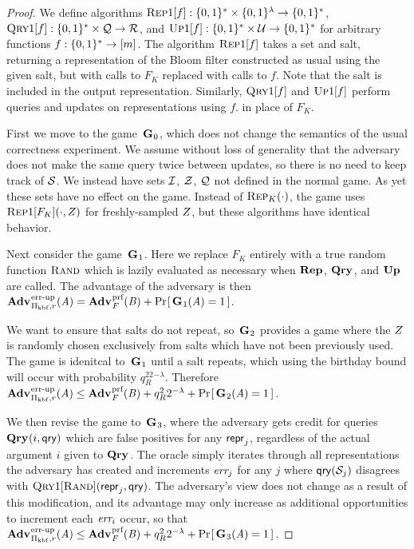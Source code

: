\begin{proof}We define algorithms $\textsc{Rep}1[f]: \{0,1\}^* \times \{0,1\}^\lambda \to \{0,1\}^*$, $\textsc{Qry}1[f]: \{0,1\}^* \times \mathcal{Q} \to \mathcal{R}$, and $\textsc{Up}1[f]: \{0,1\}^* \times \mathcal{U} \to \{0,1\}^*$ for arbitrary functions $f: \{0,1\}^* \to [m]$. The algorithm $\textsc{Rep}1[f]$ takes a set and salt, returning a representation of the Bloom filter constructed as usual using the given salt, but with calls to $F_K$ replaced with calls to $f$. Note that the salt is included in the output representation. Similarly, $\textsc{Qry}1[f]$ and $\textsc{Up}1[f]$ perform queries and updates on representations using $f$. in place of $F_K$.

First we move to the game~$\mathbf{G}\hspace{0.5pt}_0$, which does not change the semantics of the usual correctness experiment. We assume without loss of generality that the adversary does not make the same query twice between updates, so there is no need to keep track of $\mathcal{S}$. We instead have sets $\mathcal{I}$, $\mathcal{Z}$, $\mathcal{Q}$ not defined in the normal game. As yet these sets have no effect on the game. Instead of $\textsc{Rep}_K(\cdot)$, the game uses $\textsc{Rep}1[F_K](\cdot,Z)$ for freshly-sampled $Z$, but these algorithms have identical behavior.

Next consider the game~$\mathbf{G}\hspace{0.5pt}_1$. Here we replace $F_K$ entirely with a true random function $\textsc{Rand}$ which is lazily evaluated as necessary when $\mathbf{Rep}\hspace{0.5pt}$, $\mathbf{Qry}\hspace{0.5pt}$, and $\mathbf{Up}\hspace{0.5pt}$ are called. The advantage of the adversary is then $\Adv{\errep}_{\struct_\prfbloom,r}(\advA) = \Adv{\prf}_F(\advB) + \Prob{\G_1(\advA)=1}$.

We want to ensure that salts do not repeat, so~$\mathbf{G}\hspace{0.5pt}_2$ provides a game where the $Z$ is randomly chosen exclusively from salts which have not been previously used. The game is idenitcal to~$\mathbf{G}\hspace{0.5pt}_1$ until a salt repeats, which using the birthday bound will occur with probability $q_R^22^{-\lambda}$. Therefore $\Adv{\errep}_{\struct_\prfbloom,r}(\advA) \le \Adv{\prf}_F(\advB) + q_R^22^{-\lambda} + \Prob{\G_2(\advA)=1}$.

We then revise the game to~$\mathbf{G}\hspace{0.5pt}_3$, where the adversary gets credit for queries $\mathbf{Qry}\hspace{0.5pt}(i,\mathsf{qry})$ which are false positives for any $\mathsf{repr}_j$, regardless of the actual argument $i$ given to $\mathbf{Qry}\hspace{0.5pt}$. The oracle simply iterates through all representations the adversary has created and increments $\textit{err}_j$ for any $j$ where $\mathsf{qry}(\mathcal{S}_j)$ disagrees with $\textsc{Qry}1[\textsc{Rand}](\mathsf{repr}_j,\mathsf{qry})$. The adversary's view does not change as a result of this modification, and its advantage may only increase as additional opportunities to increment each $\textit{err}_i$ occur, so that $\Adv{\errep}_{\struct_\prfbloom,r}(\advA) \le \Adv{\prf}_F(\advB) + q_R^22^{-\lambda} + \Prob{\G_3(\advA)=1}$.


\end{proof}
